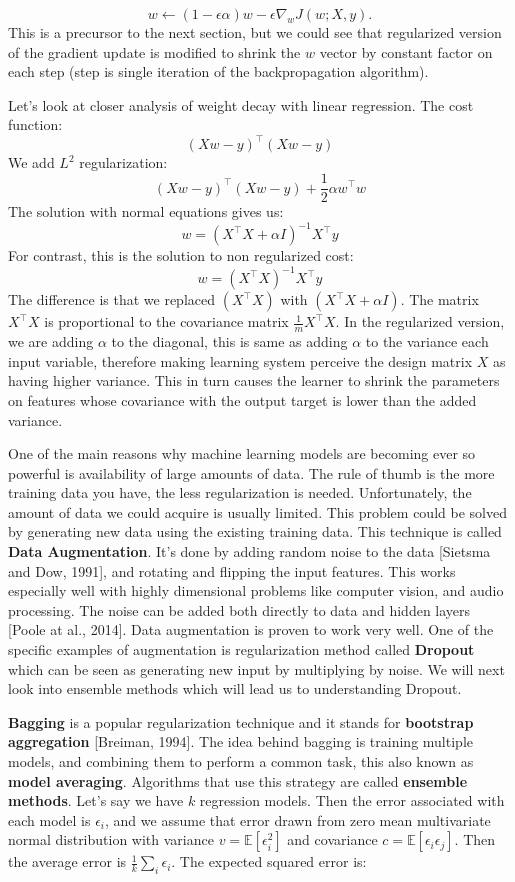 \documentclass[paper=a4, fontsize=11pt]{scrartcl}
\numberwithin{equation}{section}		%
\numberwithin{figure}{section}			%
\numberwithin{table}{section}			%
\begin{document}
	$$
	w \leftarrow (1-\epsilon\alpha)w - \epsilon \nabla_w J(w;X,y).
	$$
	This is a precursor to the next section, but we could see that regularized version of the gradient update is modified to shrink the $w$ vector by constant factor on each step (step is single iteration of the backpropagation algorithm). 
	\par Let's look at closer analysis of weight decay with linear regression. The cost function:
	$$ 
	(Xw-y)^\top(Xw-y)
	$$
	We add $L^2$ regularization:
	$$
	(Xw-y)^\top(Xw-y) + \frac{1}{2} \alpha w^\top w
	$$
	The solution with normal equations gives us:
	$$
	w = (X^\top X + \alpha I)^{-1}X^\top y
	$$
	For contrast, this is the solution to non regularized cost:
	$$
	w = (X^\top X)^{-1}X^\top y
	$$
	The difference is that we replaced $(X^\top X)$ with $(X^\top X + \alpha I)$. The matrix $X^\top X$ is proportional to the covariance matrix $\frac{1}{m}X^\top X$. In the regularized version, we are adding $\alpha$ to the diagonal, this is same as adding $\alpha$ to the variance each input variable, therefore making learning system perceive the design matrix $X$ as having higher variance. This in turn causes the learner to shrink the parameters on features whose covariance with the output target is lower than the added variance.
	\par
	One of the main reasons why machine learning models are becoming ever so powerful is availability of large amounts of data. The rule of thumb is the more training data you have, the less regularization is needed. Unfortunately, the amount of data we could acquire is usually limited. This problem could be solved by generating new data using the existing training data. This technique is called \textbf{Data Augmentation}. It's done by adding random noise to the data [Sietsma and Dow, 1991], and rotating and flipping the input features. This works especially well with highly dimensional problems like computer vision, and audio processing. The noise can be added both directly to data and hidden layers [Poole at al., 2014]. Data augmentation is proven to work very well. One of the specific examples of augmentation is regularization method called \textbf{Dropout} which can be seen as generating new input by multiplying by noise. We will next look into ensemble methods which will lead us to understanding Dropout.
	\par 
	\textbf{Bagging} is a popular regularization technique and it stands for \textbf{bootstrap aggregation} [Breiman, 1994]. The idea behind bagging is training multiple models, and combining them to perform a common task, this also known as \textbf{model averaging}. Algorithms that use this strategy are called \textbf{ensemble methods}. Let's say we have $k$ regression models. Then the error associated with each model is $\epsilon_i$, and we assume that error drawn from zero mean multivariate normal distribution with variance $v = \mathbb E[\epsilon_i^2] $ and covariance $c = \mathbb E[\epsilon_i\epsilon_j] $. Then the average error is $\frac{1}{k}\sum_i \epsilon_i$. The expected squared error is:
\end{document}
